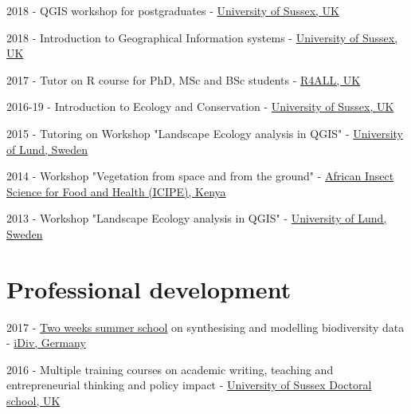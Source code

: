 \documentclass[12pt,a4paper,serif]{moderncv}        %
\begin{document}
\begin{bibenum}

     \item[] 2018 - QGIS workshop for postgraduates - \href{http://sussex.ac.uk/}{University of Sussex, UK}
     
     \item[] 2018 - Introduction to Geographical Information systems - \href{http://sussex.ac.uk/}{University of Sussex, UK}

     \item[] 2017 - Tutor on R course for PhD, MSc and BSc students - \href{http://www.r4all.org/}{R4ALL, UK}
     
     \item[] 2016-19 - Introduction to Ecology and Conservation - \href{http://sussex.ac.uk/}{University of Sussex, UK}

     \item[] 2015 - Tutoring on Workshop "Landscape Ecology analysis in QGIS" - \href{http://www.lunduniversity.lu.se/}{University of Lund, Sweden}

     \item[] 2014 - Workshop "Vegetation from space and from the ground" - \href{http://www.icipe.org/}{African Insect Science for Food and Health (ICIPE), Kenya}

     \item[] 2013 - Workshop "Landscape Ecology analysis in QGIS" - \href{http://www.lunduniversity.lu.se/}{University of Lund, Sweden}

\end{bibenum}

\vspace{8pt}

\section{Professional development}

\begin{bibenum}

    \item[] 2017 - \href{https://www.idiv.de/en/events/summer_school.html}{Two weeks summer school} on synthesising and modelling biodiversity data - \href{http://www.idiv.de}{iDiv, Germany}
    
    \item[] 2016 - Multiple training courses on academic writing, teaching and entrepreneurial thinking and policy impact - \href{http://www.sussex.ac.uk}{University of Sussex Doctoral school, UK}

\end{bibenum}
\end{document}
